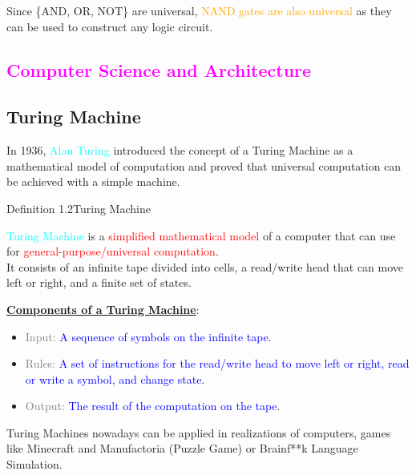 \documentclass{book}
\begin{document}
Since \{AND, OR, NOT\} are universal, \textcolor{orange}{NAND gates are also universal} as they can be used to construct any logic circuit.
\textcolor{magenta}{\section{\textbf{Computer Science and Architecture}}}
\subsection{Turing Machine}
In 1936, \textcolor{cyan}{Alan Turing} introduced the concept of a Turing Machine as a mathematical model of computation and proved that universal computation can be achieved with a simple machine.\\
\begin{defBox}{Definition 1.2}{Turing Machine}
    \raggedright
    \textcolor{cyan}{Turing Machine} is a \textcolor{red}{simplified mathematical model} of a computer that can use for \textcolor{red}{general-purpose/universal computation}. \\
    It consists of an infinite tape divided into cells, a read/write head that can move left or right, and a finite set of states.
\end{defBox}
\uline{\textbf{Components of a Turing Machine}}:
\begin{itemize}
    \item \textcolor{gray}{Input:} \textcolor{blue}{A sequence of symbols on the infinite tape}.
    \item \textcolor{gray}{Rules:} \textcolor{blue}{A set of instructions for the read/write head to move left or right, read or write a symbol, and change state}.
    \item \textcolor{gray}{Output:} \textcolor{blue}{The result of the computation on the tape}.
\end{itemize}
Turing Machines nowadays can be applied in realizations of computers, games like Minecraft and Manufactoria (Puzzle Game) or Brainf**k Language Simulation.
\end{document}
